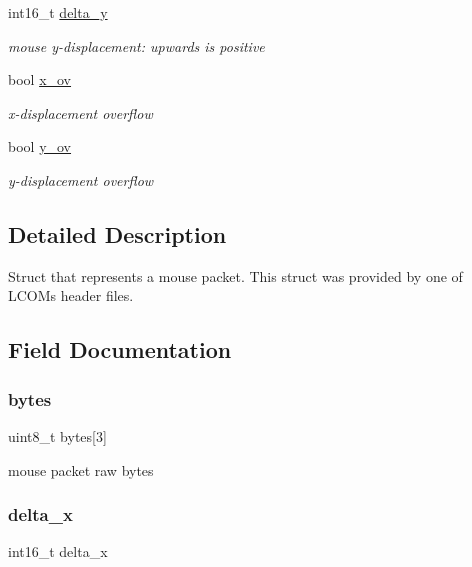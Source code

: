 \begin{DoxyCompactItemize}
int16\+\_\+t \hyperlink{structmouse__packet_a7699dbabc822179a121331d93fee1301}{delta\+\_\+y}
\begin{DoxyCompactList}\small\item\em mouse y-\/displacement\+: upwards is positive \end{DoxyCompactList}\item 
bool \hyperlink{structmouse__packet_a34fd9f358287cbbc00b4a2e2d9ca894c}{x\+\_\+ov}
\begin{DoxyCompactList}\small\item\em x-\/displacement overflow \end{DoxyCompactList}\item 
bool \hyperlink{structmouse__packet_af53b041fcbe6de2aca94b8ef4189705a}{y\+\_\+ov}
\begin{DoxyCompactList}\small\item\em y-\/displacement overflow \end{DoxyCompactList}\end{DoxyCompactItemize}


\subsection{Detailed Description}
Struct that represents a mouse packet. This struct was provided by one of L\+C\+OM\textquotesingle{}s header files. 

\subsection{Field Documentation}
\mbox{\label{structmouse__packet_a89fe01e2d4cf73b27993d65029aff235}} 
\subsubsection{\texorpdfstring{bytes}{bytes}}
{\footnotesize\ttfamily uint8\+\_\+t bytes\mbox{[}3\mbox{]}}



mouse packet raw bytes 

\mbox{\label{structmouse__packet_ada6da69ab3d4f4b471ffe88827e8754c}} 
\subsubsection{\texorpdfstring{delta\+\_\+x}{delta\_x}}
{\footnotesize\ttfamily int16\+\_\+t delta\+\_\+x}



